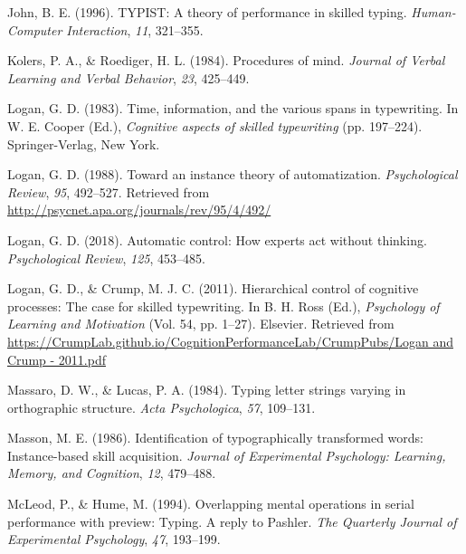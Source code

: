 \documentclass[,man,floatsintext]{apa6}
\begin{document}
\leavevmode\hypertarget{ref-john_typist:_1996}{}%
John, B. E. (1996). TYPIST: A theory of performance in skilled typing. \emph{Human-Computer Interaction}, \emph{11}, 321--355.

\leavevmode\hypertarget{ref-KolersProceduresmind1984}{}%
Kolers, P. A., \& Roediger, H. L. (1984). Procedures of mind. \emph{Journal of Verbal Learning and Verbal Behavior}, \emph{23}, 425--449.

\leavevmode\hypertarget{ref-logan_span_1983}{}%
Logan, G. D. (1983). Time, information, and the various spans in typewriting. In W. E. Cooper (Ed.), \emph{Cognitive aspects of skilled typewriting} (pp. 197--224). Springer-Verlag, New York.

\leavevmode\hypertarget{ref-logan_toward_1988}{}%
Logan, G. D. (1988). Toward an instance theory of automatization. \emph{Psychological Review}, \emph{95}, 492--527. Retrieved from \url{http://psycnet.apa.org/journals/rev/95/4/492/}

\leavevmode\hypertarget{ref-logan_2018}{}%
Logan, G. D. (2018). Automatic control: How experts act without thinking. \emph{Psychological Review}, \emph{125}, 453--485.

\leavevmode\hypertarget{ref-logan_hierarchical_2011}{}%
Logan, G. D., \& Crump, M. J. C. (2011). Hierarchical control of cognitive processes: The case for skilled typewriting. In B. H. Ross (Ed.), \emph{Psychology of Learning and Motivation} (Vol. 54, pp. 1--27). Elsevier. Retrieved from \href{https://CrumpLab.github.io/CognitionPerformanceLab/CrumpPubs/Logan\%20and\%20Crump\%20-\%202011.pdf}{https://CrumpLab.github.io/CognitionPerformanceLab/CrumpPubs/Logan and Crump - 2011.pdf}

\leavevmode\hypertarget{ref-massaro_typing_1984}{}%
Massaro, D. W., \& Lucas, P. A. (1984). Typing letter strings varying in orthographic structure. \emph{Acta Psychologica}, \emph{57}, 109--131.

\leavevmode\hypertarget{ref-MassonIdentificationtypographicallytransformed1986}{}%
Masson, M. E. (1986). Identification of typographically transformed words: Instance-based skill acquisition. \emph{Journal of Experimental Psychology: Learning, Memory, and Cognition}, \emph{12}, 479--488.

\leavevmode\hypertarget{ref-mcleod_overlapping_1994}{}%
McLeod, P., \& Hume, M. (1994). Overlapping mental operations in serial performance with preview: Typing. A reply to Pashler. \emph{The Quarterly Journal of Experimental Psychology}, \emph{47}, 193--199.
\end{document}
